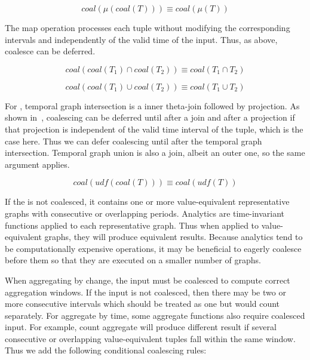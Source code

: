 \begin{equation}
coal(\mu(coal(T))) \equiv coal(\mu(T))
\label{rul:coalr6}
\end{equation}

The map operation processes each tuple without modifying the
corresponding intervals and independently of the valid time of the
input.  Thus, as above, coalesce can be deferred.

\begin{equation}
coal(coal(T_1) \cap coal(T_2)) \equiv coal(T_1 \cap T_2)
\label{rul:coalr7}
\end{equation}

\begin{equation}
coal(coal(T_1) \cup coal(T_2)) \equiv coal(T_1 \cup T_2)
\label{rul:coalr8}
\end{equation}

For \trg, temporal graph intersection is a inner theta-join followed
by projection.  As shown in~\cite{DBLP:conf/vldb/BohlenSS96},
coalescing can be deferred until after a join and after a projection
if that projection is independent of the valid time interval of the
tuple, which is the case here.  Thus we can defer coalescing until
after the temporal graph intersection.  Temporal graph union is also a
join, albeit an outer one, so the same argument applies.

\begin{equation}
coal(udf(coal(T))) \equiv coal(udf(T))
\label{rul:coalr9}
\end{equation}

If the \tg is not coalesced, it contains one or more value-equivalent
representative graphs with consecutive or overlapping periods.
Analytics are time-invariant functions applied to each representative
graph.  Thus when applied to value-equivalent graphs, they will
produce equivalent results.  Because analytics tend to be
computationally expensive operations, it may be beneficial to eagerly
coalesce before them so that they are executed on a smaller number of
graphs.

When aggregating by change, the input must be coalesced to compute
correct aggregation windows.  If the input is not coalesced, then
there may be two or more consecutive intervals which should be treated
as one but would count separately. For aggregate by time, some
aggregate functions also require coalesced input.  For example, count
aggregate will produce different result if several consecutive or
overlapping value-equivalent tuples fall within the same window.  Thus
we add the following conditional coalescing rules:

